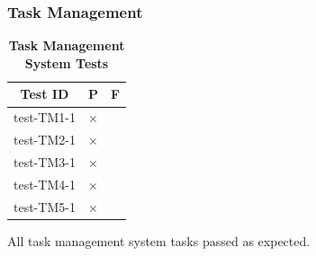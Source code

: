 \documentclass[12pt, titlepage]{article}
\begin{document}



					
					
					




\subsubsection{Task Management}

\begin{table}[H]
\centering
\begin{tabular}{|c|c|c|}
\hline
Test ID & P & F\\
\hline 
test-TM1-1 & $\times$ & \\
test-TM2-1 & $\times$ & \\
test-TM3-1 & $\times$ & \\
test-TM4-1 & $\times$ & \\
test-TM5-1 & $\times$ & \\
\hline
\end{tabular}
\caption{\bf Task Management System Tests}
\end{table}

All task management system tasks passed as expected.


					
					
					
\end{document}

